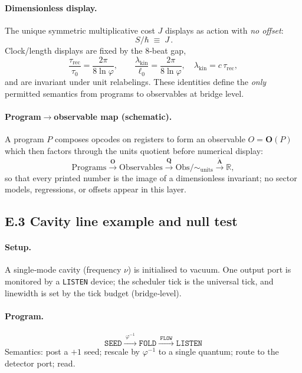\documentclass[11pt]{article}
\begin{document}
\begin{proposition}
\paragraph{Dimensionless display.}
The unique symmetric multiplicative cost $J$ displays as action with \emph{no offset}:
\[
\boxed{\,S/\hbar\;\equiv\;J\,}.
\]
Clock/length displays are fixed by the 8‑beat gap,
\[
\frac{\tau_{\mathrm{rec}}}{\tau_{0}}=\frac{2\pi}{8\ln\varphi},
\qquad
\frac{\lambda_{\mathrm{kin}}}{\ell_{0}}=\frac{2\pi}{8\ln\varphi},
\quad
\lambda_{\mathrm{kin}}=c\,\tau_{\mathrm{rec}},
\]
and are invariant under unit relabelings. These identities define the \emph{only} permitted semantics from programs to observables at bridge level.

\paragraph{Program$\to$observable map (schematic).}
A program $P$ composes opcodes on registers to form an observable $O=\mathbf O(P)$ which then factors through the units quotient before numerical display:
\[
\text{Programs}\xrightarrow{\;\mathbf O\;}\text{Observables}\xrightarrow{\;\mathbf Q\;}\text{Obs}/\!\sim_{\text{units}}\xrightarrow{\;\widetilde{\mathbf A}\;}\mathbb R,
\]
so that every printed number is the image of a dimensionless invariant; no sector models, regressions, or offsets appear in this layer.

\subsection*{E.3  Cavity line example and null test}

\paragraph{Setup.}
A single‑mode cavity (frequency $\nu$) is initialised to vacuum. One output port is monitored by a \texttt{LISTEN} device; the scheduler tick is the universal tick, and linewidth is set by the tick budget (bridge‑level).

\paragraph{Program.}
\[
\texttt{SEED}\xrightarrow{\;\varphi^{-1}\;}\texttt{FOLD}\xrightarrow{\;\texttt{FLOW}\;}\texttt{LISTEN}
\]
Semantics: post a $+1$ seed; rescale by $\varphi^{-1}$ to a single quantum; route to the detector port; read.


\end{proposition}
\end{document}
